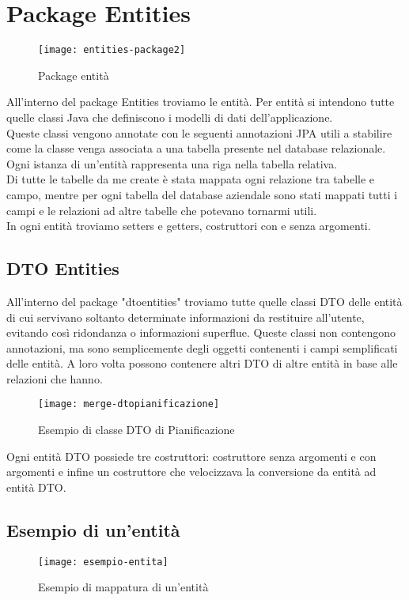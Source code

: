 \section{Package Entities}

\begin{figure}[H] 
    \centering 
    \texttt{[image: entities-package2]} 
    \caption{Package entità}
\end{figure}

\noindent All'interno del package Entities troviamo le entità. Per entità si intendono tutte quelle classi Java che definiscono i modelli di dati dell'applicazione.\\
Queste classi vengono annotate con le seguenti annotazioni JPA utili a stabilire come la classe venga associata a una tabella presente nel database relazionale. Ogni istanza di un'entità rappresenta una riga nella tabella relativa.\\
Di tutte le tabelle da me create è stata mappata ogni relazione tra tabelle e campo, mentre per ogni tabella del database aziendale sono stati mappati tutti i campi e le relazioni ad altre tabelle che potevano tornarmi utili.\\
In ogni entità troviamo setters e getters, costruttori con e senza argomenti.\\
\subsection{DTO Entities}
All'interno del package "dtoentities" troviamo tutte quelle classi DTO delle entità di cui servivano soltanto determinate informazioni da restituire all'utente, evitando così ridondanza o informazioni superflue. Queste classi non contengono annotazioni, ma sono semplicemente degli oggetti contenenti i campi semplificati delle entità. A loro volta possono contenere altri DTO di altre entità in base alle relazioni che hanno.
\begin{figure}[H] 
    \centering 
    \texttt{[image: merge-dtopianificazione]} 
    \caption{Esempio di classe DTO di Pianificazione}
\end{figure}
\noindent Ogni entità DTO possiede tre costruttori: costruttore senza argomenti e con argomenti e infine un costruttore che velocizzava la conversione da entità ad entità DTO.

\subsection{Esempio di un'entità}
\begin{figure}[H] 
    \centering 
    \texttt{[image: esempio-entita]} 
    \caption{Esempio di mappatura di un'entità}
\end{figure}

